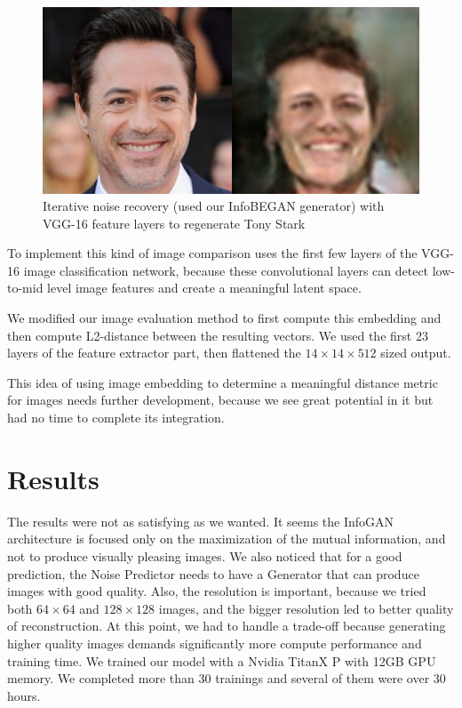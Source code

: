 \documentclass{egpubl}
\begin{document}
\begin{figure}[!htb]
	\centering
	\includegraphics[width=1\linewidth]{pic/InfoBEGAN_tony_recovered_VGG16}
	\caption{Iterative noise recovery (used our InfoBEGAN generator) with VGG-16 feature layers to regenerate Tony Stark}

\end{figure}

To implement this kind of image comparison %
\cite{abdal2019image2stylegan} uses the first few layers of the VGG-16 image classification network, %
because these convolutional layers can detect low-to-mid level image features and %
create a meaningful latent space.

We modified our image evaluation method to first compute %
this embedding and then compute L2-distance between the resulting vectors. We used the first 23 layers of the feature extractor part, then flattened the $14\times 14\times 512$ sized output.

This idea of using image embedding to determine a meaningful distance metric for images needs further development, %
because we see great potential in it but had no time to complete its integration.%

\section{Results}
The results were not as satisfying as we wanted. It seems the InfoGAN architecture is focused only on the maximization of the mutual information, %
and not to produce visually pleasing images. We also noticed that for a good prediction, %
the Noise Predictor needs to have a Generator that can produce images with good quality. Also, the resolution is important, because we tried both $64\times 64$ and $128\times 128$ images, and the bigger resolution led to better quality of reconstruction. At this point, %
we had to handle a trade-off because generating higher quality images demands significantly %
more compute performance and %
training time. We trained our model with a Nvidia TitanX P with 12GB GPU memory. We completed more than 30 trainings and several of them were%
over 30 hours.
\end{document}
